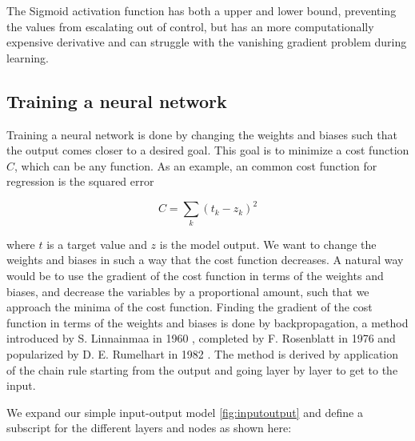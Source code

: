 The Sigmoid activation function has both a upper and lower bound, preventing the values from escalating out of control, but has an more computationally expensive derivative and can struggle with the vanishing gradient problem during learning.

\subsection{Training a neural network}

Training a neural network is done by changing the weights and biases such that the output comes closer to a desired goal. This goal is to minimize a cost function $C$, which can be any function. As an example, an common cost function for regression is the squared error

\begin{equation}
    C = \sum_k \left ( t_k - z_k \right )^2
\end{equation}

where $t$ is a target value and $z$ is the model output. We want to change the weights and biases in such a way that the cost function decreases. A natural way would be to use the gradient of the cost function in terms of the weights and biases, and decrease the variables by a proportional amount, such that we approach the minima of the cost function. Finding the gradient of the cost function in terms of the weights and biases is done by backpropagation, a method introduced by S. Linnainmaa in 1960 \cite{RosenblattBack}, completed by F. Rosenblatt in 1976 \cite{Linnainmaa1976} and popularized by D. E. Rumelhart in 1982 \cite{Rumelhart1986}. The method is derived by application of the chain rule starting from the output and going layer by layer to get to the input. 

We expand our simple input-output model \ref{fig:inputoutput} and define a subscript for the different layers and nodes as shown here:

